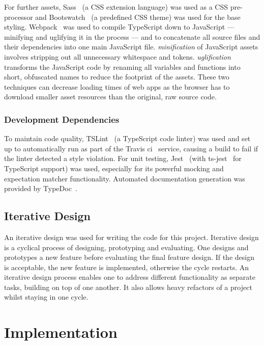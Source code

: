 \documentclass[nobib, a4paper, twoside, justified]{tufte-book}
\begin{document}
For further assets, Sass~\autocite{sass-lang} (a CSS extension language) was used as a CSS
pre-processor and Bootswatch~\autocite{bootswatch-flatly} (a predefined CSS theme) was used for the
base styling.  Webpack~\autocite{webpack} was used to compile TypeScript down to JavaScript ---
minifying and uglifying it in the process --- and to concatenate all source files and their
dependencies into one main JavaScript file. \textit{\Gls{minification}} of JavaScript assets
involves stripping out all unnecessary whitespace and tokens.  \textit{\Gls{uglification}}
transforms the JavaScript code by renaming all variables and functions into short, obfuscated names
to reduce the footprint of the assets. These two techniques can decrease loading times of web apps
as the browser has to download smaller asset resources than the original, raw source code.

\subsection{Development Dependencies}%
\label{sub:development_dependencies}

To maintain code quality, TSLint~\autocite{tslint} (a TypeScript code linter) was used and set up to
automatically run as part of the Travis \gls{ci}~\autocite{travis} service, causing a build to fail
if the linter detected a style violation. For unit testing, Jest~\autocite{jest} (with
ts-jest~\autocite{ts-jest} for TypeScript support) was used, especially for its powerful mocking
and expectation matcher functionality. Automated documentation generation was provided by
TypeDoc~\autocite{typedoc}.

\section{Iterative Design}%
\label{sec:iterative_design}

An iterative design was used for writing the code for this project. Iterative design is a cyclical
process of designing, prototyping and evaluating. One designs and prototypes a new feature before
evaluating the final feature design. If the design is acceptable, the new feature is implemented,
otherwise the cycle restarts. An iterative design process enables one to address different functionality
as separate tasks, building on top of one another. It also allows heavy refactors of a project
whilst staying in one cycle.

\chapter{Implementation}%
\label{cha:implementation}
\end{document}
